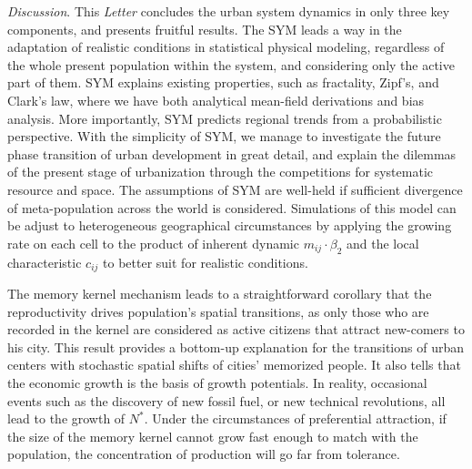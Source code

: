 \documentclass[reprint,unsortedaddress,amsmath,amssymb,aps,prl,showkeys]{revtex4-2}
\begin{document}
\textit{Discussion}. 
This \emph{Letter} concludes the urban system dynamics in only three key components, and presents fruitful results. The SYM leads a way in the adaptation of realistic conditions in statistical physical modeling, regardless of the whole present population within the system, and considering only the active part of them. SYM explains existing properties, such as fractality, Zipf's, and Clark's law, where we have both analytical mean-field derivations and bias analysis. More importantly, SYM predicts regional trends from a probabilistic perspective. With the simplicity of SYM, we manage to investigate the future phase transition of urban development in great detail, and explain the dilemmas of the present stage of urbanization through the competitions for systematic resource and space. The assumptions of SYM are well-held if sufficient divergence of meta-population across the world is considered. Simulations of this model can be adjust to heterogeneous geographical circumstances by applying the growing rate on each cell to the product of inherent dynamic $m_{ij}\cdot \beta_2$ and the local characteristic $c_{ij}$ to better suit for realistic conditions.

The memory kernel mechanism leads to a straightforward corollary that the reproductivity drives population's spatial transitions, as only those who are recorded in the kernel are considered as active citizens that attract new-comers to his city. This result provides a bottom-up explanation for the transitions of urban centers with stochastic spatial shifts of cities' memorized people. It also tells that the economic growth is the basis of growth potentials. In reality, occasional events such as the discovery of new fossil fuel, or new technical revolutions, all lead to the growth of $N^*$. Under the circumstances of preferential attraction, if the size of the memory kernel cannot grow fast enough to match with the population, the concentration of production will go far from tolerance. 
\end{document}
